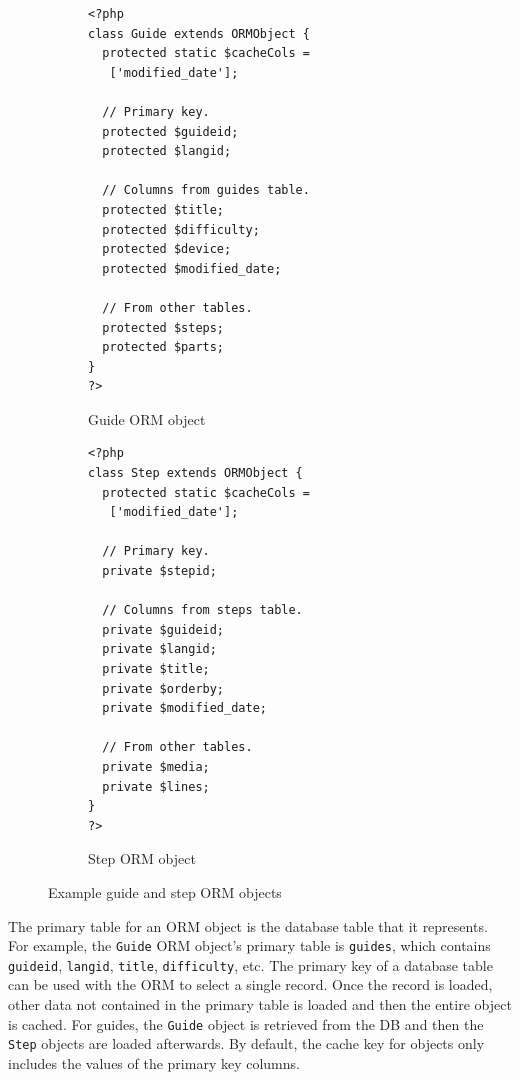 \documentclass[12pt]{ucthesis}
\begin{document}
\begin{figure}[h]
\begin{subfigure}[h]{0.5\textwidth}
\begin{ssp}
\begin{verbatim}
<?php
class Guide extends ORMObject {
  protected static $cacheCols =
   ['modified_date'];

  // Primary key.
  protected $guideid;
  protected $langid;

  // Columns from guides table.
  protected $title;
  protected $difficulty;
  protected $device;
  protected $modified_date;

  // From other tables.
  protected $steps;
  protected $parts;
}
?>
\end{verbatim}
\caption{Guide ORM object}
\label{fig:guideORMTable}
\end{ssp}
\end{subfigure}
\begin{subfigure}[h]{0.5\textwidth}
\begin{ssp}
\begin{verbatim}
<?php
class Step extends ORMObject {
  protected static $cacheCols =
   ['modified_date'];

  // Primary key.
  private $stepid;

  // Columns from steps table.
  private $guideid;
  private $langid;
  private $title;
  private $orderby;
  private $modified_date;

  // From other tables.
  private $media;
  private $lines;
}
?>
\end{verbatim}
\caption{Step ORM object}
\label{fig:stepORMObject}
\end{ssp}
\end{subfigure}
\caption{Example guide and step ORM objects}
\label{fig:cachingExample}
\end{figure}

The primary table for an ORM object is the database table that it represents.
For example, the {\tt Guide} ORM object's primary table is {\tt guides}, which contains {\tt guideid}, {\tt langid}, {\tt title}, {\tt difficulty}, etc.
The primary key of a database table can be used with the ORM to select a single record.
Once the record is loaded, other data not contained in the primary table is loaded and then the entire object is cached.
For guides, the {\tt Guide} object is retrieved from the DB and then the {\tt Step} objects are loaded afterwards.
By default, the cache key for objects only includes the values of the primary key columns.
\end{document}
